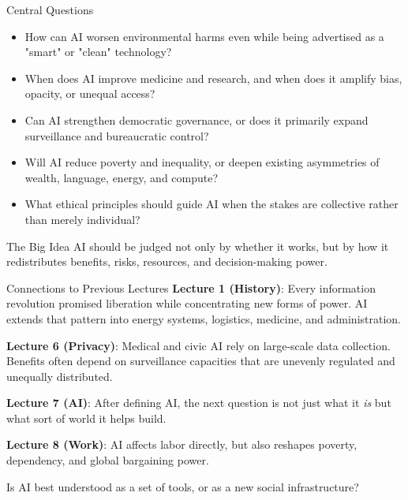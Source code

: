 \documentclass[aspectratio=169,11pt]{beamer}
\begin{document}
\begin{frame}{Central Questions}
\begin{itemize}
    \item How can AI worsen environmental harms even while being advertised as a "smart" or "clean" technology?
    \item When does AI improve medicine and research, and when does it amplify bias, opacity, or unequal access?
    \item Can AI strengthen democratic governance, or does it primarily expand surveillance and bureaucratic control?
    \item Will AI reduce poverty and inequality, or deepen existing asymmetries of wealth, language, energy, and compute?
    \item What ethical principles should guide AI when the stakes are collective rather than merely individual?
\end{itemize}

\vspace{0.2cm}
\begin{alertblock}{The Big Idea}
AI should be judged not only by whether it works, but by how it redistributes benefits, risks, resources, and decision-making power.
\end{alertblock}
\end{frame}

\begin{frame}{Connections to Previous Lectures}
\textbf{Lecture 1 (History)}: Every information revolution promised liberation while concentrating new forms of power. AI extends that pattern into energy systems, logistics, medicine, and administration.

\vspace{0.2cm}
\textbf{Lecture 6 (Privacy)}: Medical and civic AI rely on large-scale data collection. Benefits often depend on surveillance capacities that are unevenly regulated and unequally distributed.

\vspace{0.2cm}
\textbf{Lecture 7 (AI)}: After defining AI, the next question is not just what it \emph{is} but what sort of world it helps build.

\vspace{0.2cm}
\textbf{Lecture 8 (Work)}: AI affects labor directly, but also reshapes poverty, dependency, and global bargaining power.

\begin{discussionbox}[Discussion]
Is AI best understood as a set of tools, or as a new social infrastructure?
\end{discussionbox}
\end{frame}
\end{document}
